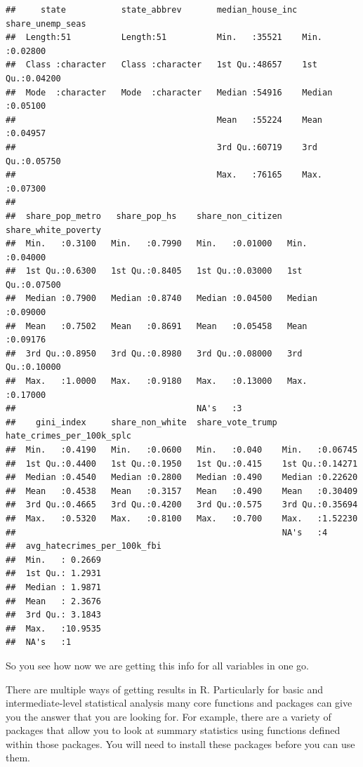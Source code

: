 \documentclass[
]{book}
\begin{document}
\begin{verbatim}
##     state           state_abbrev       median_house_inc share_unemp_seas 
##  Length:51          Length:51          Min.   :35521    Min.   :0.02800  
##  Class :character   Class :character   1st Qu.:48657    1st Qu.:0.04200  
##  Mode  :character   Mode  :character   Median :54916    Median :0.05100  
##                                        Mean   :55224    Mean   :0.04957  
##                                        3rd Qu.:60719    3rd Qu.:0.05750  
##                                        Max.   :76165    Max.   :0.07300  
##                                                                          
##  share_pop_metro   share_pop_hs    share_non_citizen share_white_poverty
##  Min.   :0.3100   Min.   :0.7990   Min.   :0.01000   Min.   :0.04000    
##  1st Qu.:0.6300   1st Qu.:0.8405   1st Qu.:0.03000   1st Qu.:0.07500    
##  Median :0.7900   Median :0.8740   Median :0.04500   Median :0.09000    
##  Mean   :0.7502   Mean   :0.8691   Mean   :0.05458   Mean   :0.09176    
##  3rd Qu.:0.8950   3rd Qu.:0.8980   3rd Qu.:0.08000   3rd Qu.:0.10000    
##  Max.   :1.0000   Max.   :0.9180   Max.   :0.13000   Max.   :0.17000    
##                                    NA's   :3                            
##    gini_index     share_non_white  share_vote_trump hate_crimes_per_100k_splc
##  Min.   :0.4190   Min.   :0.0600   Min.   :0.040    Min.   :0.06745          
##  1st Qu.:0.4400   1st Qu.:0.1950   1st Qu.:0.415    1st Qu.:0.14271          
##  Median :0.4540   Median :0.2800   Median :0.490    Median :0.22620          
##  Mean   :0.4538   Mean   :0.3157   Mean   :0.490    Mean   :0.30409          
##  3rd Qu.:0.4665   3rd Qu.:0.4200   3rd Qu.:0.575    3rd Qu.:0.35694          
##  Max.   :0.5320   Max.   :0.8100   Max.   :0.700    Max.   :1.52230          
##                                                     NA's   :4                
##  avg_hatecrimes_per_100k_fbi
##  Min.   : 0.2669            
##  1st Qu.: 1.2931            
##  Median : 1.9871            
##  Mean   : 2.3676            
##  3rd Qu.: 3.1843            
##  Max.   :10.9535            
##  NA's   :1
\end{verbatim}

So you see how now we are getting this info for all variables in one go.

There are multiple ways of getting results in R. Particularly for basic and intermediate-level statistical analysis many core functions and packages can give you the answer that you are looking for. For example, there are a variety of packages that allow you to look at summary statistics using functions defined within those packages. You will need to install these packages before you can use them.
\end{document}
